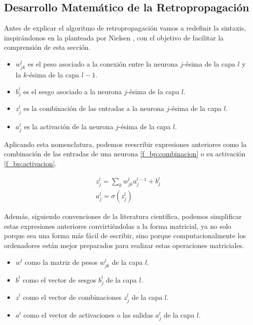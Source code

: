 \appendix
\begin{appendices}

\chapter{Desarrollo Matemático de la Retropropagación} \label{anexo:retropropagacion}

Antes de explicar el algoritmo de retropropagación vamos a redefinir la sintaxis, inspirándonos en la planteada por Nielsen \citeyear{nn_dl__michael_nielsen_2015}, con el objetivo de facilitar la comprensión de esta sección.

\begin{itemize}
	\item $w_{jk}^l$ es el peso asociado a la conexión entre la neurona $j$-ésima de la capa $l$ y la $k$-ésima de la capa $l-1$.
	\item $b_{j}^l$ es el sesgo asociado a la neurona $j$-ésima de la capa $l$.
	\item $z_{j}^l$ es la combinación de las entradas a la neurona $j$-ésima de la capa $l$.
	\item $a_{j}^l$ es la activación de la neurona $j$-ésima de la capa $l$.
\end{itemize}

Aplicando esta nomenclatura, podemos reescribir expresiones anteriores como la combinación de las entradas de una neurona \eqref{f_bp:combinacion} o su activación \eqref{f_bp:activacion}.

\begin{align}
	z_{j}^l = \sum_k w_{jk}^l a_{j}^{l-1} + b_j^l\label{f_bp:combinacion} \\
	a_j^l = \sigma(z_j^l)\label{f_bp:activacion}
\end{align}

Además, siguiendo convenciones de la literatura científica, podemos simplificar estas expresiones anteriores convirtiéndolas a la forma matricial, ya no solo porque sea una forma más fácil de escribir, sino porque computacionalmente los ordenadores están mejor preparados para realizar estas operaciones matriciales.

\begin{itemize}
	\item $w^l$ como la matriz de pesos $w_{jk}^l$ de la capa $l$.
	\item $b^l$ como el vector de sesgos $b_j^l$ de la capa $l$.
	\item $z^l$ como el vector de combinaciones $z_j^l$ de la capa $l$.
	\item $a^l$ como el vector de activaciones o las salidas $a_j^l$ de la capa $l$.
\end{itemize}


\end{appendices}
